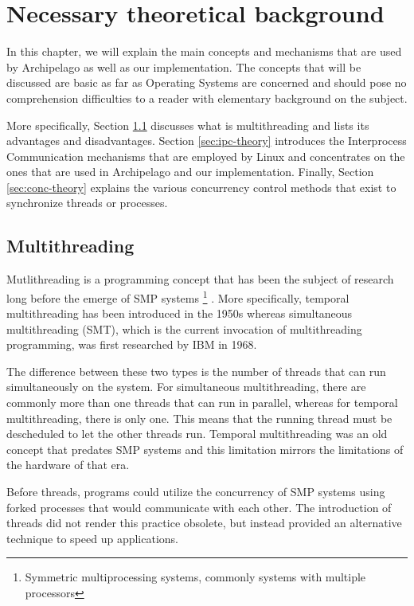 \chapter{Necessary theoretical background}\label{ch:theory}

In this chapter, we will explain the main concepts and mechanisms that are used 
by Archipelago as well as our implementation. The concepts that will be 
discussed are basic as far as Operating Systems are concerned and should pose 
no comprehension difficulties to a reader with elementary background on the 
subject.

More specifically, Section \ref{sec:multi-theory} discusses what is 
multithreading and lists its advantages and disadvantages. Section 
\ref{sec:ipc-theory} introduces the Interprocess Communication mechanisms that 
are employed by Linux and concentrates on the ones that are used in Archipelago 
and our implementation. Finally, Section \ref{sec:conc-theory} explains the 
various concurrency control methods that exist to synchronize threads or 
processes.

\section{Multithreading}\label{sec:multi-theory}


Mutlithreading is a programming concept that has been the subject of research 
long before the emerge of SMP systems
\footnote{Symmetric multiprocessing systems, commonly systems with multiple 
	processors}
. More specifically, temporal multithreading has been introduced in the 1950s 
whereas simultaneous multithreading (SMT), which is the current invocation of 
multithreading programming, was first researched by IBM in 1968\cite{mt}.

The difference between these two types is the number of threads that can run 
simultaneously on the system. For simultaneous multithreading, there are 
commonly more than one threads that can run in parallel, whereas for temporal 
multithreading, there is only one. This means that the running thread must be 
descheduled to let the other threads run. Temporal multithreading was an old 
concept that predates SMP systems and this limitation mirrors the limitations 
of the hardware of that era.

Before threads, programs could utilize the concurrency of SMP systems using 
forked processes that would communicate with each other. The introduction of 
threads did not render this practice obsolete, but instead provided an 
alternative technique to speed up applications.


